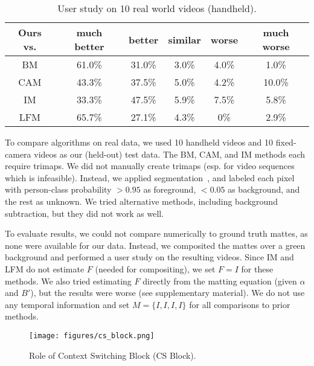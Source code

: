 \documentclass[10pt,twocolumn,letterpaper]{article}
\begin{document}
\begin{table}[!h]
\setlength\tabcolsep{2pt}
	\centering
	\small
	\captionsetup{justification=centering}
    	\vspace{-.5em}
		\begin{tabular}{c|ccccc}
			\toprule
			 Ours vs. &  much better & better & similar & worse & much worse \\ 
			 \midrule
			 BM & 61.0\% & 31.0\% & 3.0\% & 4.0\% & 1.0\% \\
			 CAM & 43.3\% & 37.5\% & 5.0\% & 4.2\% & 10.0\%\\
			 IM & 33.3\% & 47.5\% & 5.9\% & 7.5\% & 5.8\%\\
			 LFM & 65.7\% & 27.1\% & 4.3\% & 0\% & 2.9\%\\
			\bottomrule
		\end{tabular}
		\vspace{-.5em}
		\caption{\small User study on 10 real world videos (handheld).}
	\vspace{-1em}
	\label{tab:real-hand}
\end{table}



To compare algorithms on real data, we used 10 handheld videos and 10 fixed-camera videos as our (held-out) test data.  The BM, CAM, and IM methods each require trimaps.  We did not manually create trimaps (esp. for video sequences which is infeasible).  Instead, we applied segmentation~\cite{deeplabv3plus2018}, and labeled each pixel with person-class probability $>0.95$ as foreground, $<0.05$ as background, and the rest as unknown. We tried alternative methods, including background subtraction, but they did not work as well.



To evaluate results, we could not compare numerically to ground truth mattes, as none were available for our data.  Instead, we composited the mattes over a green background and performed a user study on the resulting videos. Since IM and LFM do not estimate $F$ (needed for compositing), we set $F = I$ for these methods.  We also tried estimating $F$ directly from the matting equation (given $\alpha$ and $B'$), but the results were worse (see supplementary material). We do not use any temporal information and set $M=\{I,I,I,I\}$ for all comparisons to prior methods.





\begin{figure}[ht!]
	\centering
	\texttt{[image: figures/cs\_block.png]}    \vspace{-0.5em}
	\caption{\small Role of Context Switching Block (CS Block).} 
	\vspace{-0.5em}
	\label{fig:cs_block}
\end{figure}
\end{document}
